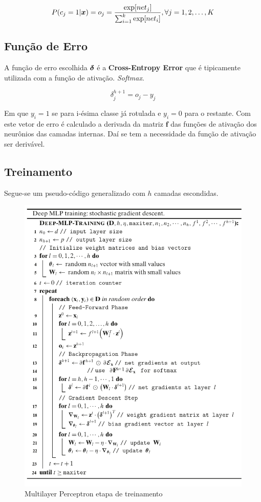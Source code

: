 \[P({c_j} = 1|\boldsymbol{x}) = {o_j} = \frac{{\exp [net_j]}}{{\sum\nolimits_{i = 1}^k {\exp [net_i]} }},\forall j = 1,2, \ldots ,K\]

\subsection{Função de Erro}

A função de erro escolhida $\boldsymbol{\delta}$ é a \textbf{Cross-Entropy Error} que é tipicamente utilizada com a função de ativação. \textit{Softmax}.

\[\delta _j^{h + 1} = {o_j} - {y_j}\]

Em que $y_i = 1$ se para i-ésima classe já rotulada e $y_i = 0$ para o restante. Com este vetor de erro é calculado a derivada da matriz $\textbf{f}$ das funções de ativação dos neurônios das camadas internas. Daí se tem a necessidade da função de ativação ser derivável.

\subsection{Treinamento}

Segue-se um pseudo-código generalizado com $h$ camadas escondidas.

\begin{figure}[H]
  \centering
  \includegraphics{pdf/mlp-alg.pdf}
  \caption{Multilayer Perceptron etapa de treinamento}
  \label{fig:mlpalg}
\end{figure}

